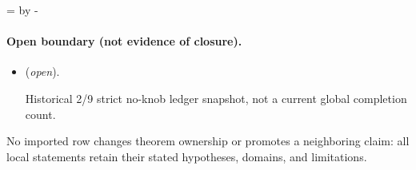 \documentclass[11pt]{article}
\theoremstyle{definition}
\theoremstyle{remark}
\let\MTToriginalitem\item
\renewcommand{\item}{\par\MTToriginalitem}
\begin{document}
\par\begingroup{}=\pagegoal\advance{} by -\pagetotal\ifdim\dimen0<7\baselineskip\newpage\fi\endgroup
\paragraph{Open boundary (not evidence of closure).}
\begin{itemize}
\setlength{\itemsep}{0.25em}
\item {} (\emph{open}).\par Historical 2/9
strict no-knob ledger snapshot, not a current global completion count.
\end{itemize}

No imported row changes theorem ownership or promotes a neighboring claim: all local statements retain their stated hypotheses, domains, and limitations.

\begingroup
\raggedright

\endgroup
\end{document}
